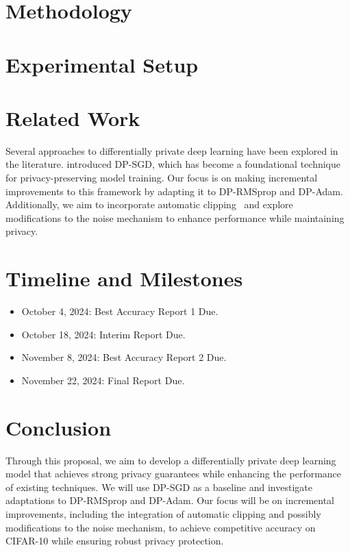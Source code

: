 \documentclass{article}
\begin{document}
    \section{Methodology}\label{sec:methodology}
    

    \section{Experimental Setup}\label{sec:experimental-setup}
    

    \section{Related Work}\label{sec:related-work}
    Several approaches to differentially private deep learning have been explored in the literature.
    \cite{Abadi_2016_DeepLearningDifferentialPrivacy} introduced DP-SGD, which has become a foundational technique for
    privacy-preserving model training.
    Our focus is on making incremental improvements to this framework by adapting it to DP-RMSprop and DP-Adam.
    Additionally, we aim to incorporate automatic clipping~\cite{bu2023automaticclippingdifferentiallyprivate}
    and explore modifications to the noise mechanism to enhance performance while maintaining privacy.


    \section{Timeline and Milestones}\label{sec:timeline-and-milestones}
    \begin{itemize}
        \item October 4, 2024: Best Accuracy Report 1 Due.
        \item October 18, 2024: Interim Report Due.
        \item November 8, 2024: Best Accuracy Report 2 Due.
        \item November 22, 2024: Final Report Due.
    \end{itemize}


    \section{Conclusion}\label{sec:conclusion}
    Through this proposal, we aim to develop a differentially private deep learning model that achieves strong
    privacy guarantees while enhancing the performance of existing techniques.
    We will use DP-SGD as a baseline and investigate adaptations to DP-RMSprop and DP-Adam.
    Our focus will be on incremental improvements, including the integration of automatic clipping and possibly
    modifications to the noise mechanism, to achieve competitive accuracy on CIFAR-10 while ensuring
    robust privacy protection.
\end{document}
